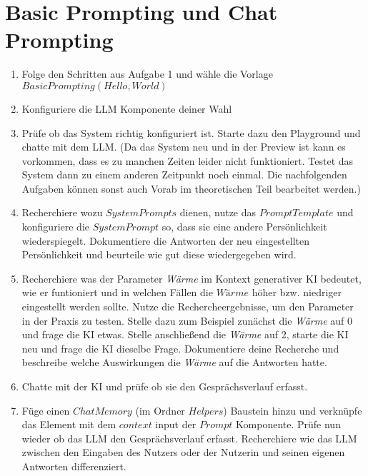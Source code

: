 \documentclass[12pt,ngerman]{AssignmentClass}
\begin{document}
\section{Basic Prompting und Chat Prompting}
\begin{enumerate}
    \item Folge den Schritten aus Aufgabe 1 und wähle die  Vorlage 
$Basic  Prompting (Hello, World)$
    \item Konfiguriere die LLM Komponente deiner Wahl
    \item Prüfe ob das System richtig konfiguriert ist. Starte dazu den Playground und chatte mit dem LLM. (Da das System neu und in der Preview ist kann es vorkommen, dass es zu manchen Zeiten leider nicht funktioniert. Testet das System dann zu einem anderen Zeitpunkt noch einmal. Die nachfolgenden Aufgaben können sonst auch Vorab im theoretischen Teil bearbeitet werden.) 
    \item Recherchiere wozu $System Prompts$ dienen, nutze das $Prompt Template$ und konfiguriere die $System Prompt$ so, dass sie eine andere Persönlichkeit wiederspiegelt. Dokumentiere die Antworten der neu eingestellten Persönlichkeit und beurteile wie gut diese wiedergegeben wird. 
    \item Recherchiere was der Parameter \textit{Wärme} im Kontext generativer KI bedeutet, wie er funtioniert und in welchen Fällen die $Wärme$ höher bzw. niedriger eingestellt werden sollte. Nutze die Rechercheergebnisse, um den Parameter in der Praxis zu testen. Stelle dazu zum Beispiel zunächst die \textit{Wärme} auf 0 und frage die KI etwas. Stelle anschließend die \textit{Wärme} auf 2, starte die KI neu und frage die KI dieselbe Frage. Dokumentiere deine Recherche und beschreibe welche Auswirkungen die \textit{Wärme} auf die Antworten hatte.   
    \item Chatte mit der KI und prüfe ob sie den Gesprächsverlauf erfasst. 
    \item Füge einen $Chat Memory$ (im Ordner $Helpers$) Baustein hinzu und verknüpfe das Element mit dem $context$ input der $Prompt$ Komponente. Prüfe nun wieder ob das LLM den Gesprächsverlauf erfasst. Recherchiere wie das LLM zwischen den Eingaben des Nutzers oder der Nutzerin und seinen eigenen Antworten differenziert.   
\end{enumerate}
\end{document}
